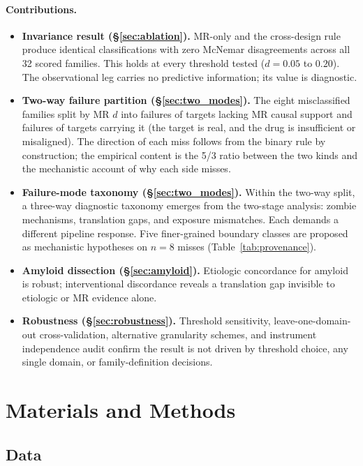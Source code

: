 \documentclass[11pt]{article}
\begin{document}
\paragraph{Contributions.}
\begin{itemize}
\item \textbf{Invariance result (\S\ref{sec:ablation}).} MR-only and the cross-design rule produce identical classifications with zero McNemar disagreements across all 32 scored families. This holds at every threshold tested ($d = 0.05$ to $0.20$). The observational leg carries no predictive information; its value is diagnostic.
\item \textbf{Two-way failure partition (\S\ref{sec:two_modes}).} The eight misclassified families split by MR $d$ into failures of targets lacking MR causal support and failures of targets carrying it (the target is real, and the drug is insufficient or misaligned). The direction of each miss follows from the binary rule by construction; the empirical content is the 5/3 ratio between the two kinds and the mechanistic account of why each side misses.
\item \textbf{Failure-mode taxonomy (\S\ref{sec:two_modes}).} Within the two-way split, a three-way diagnostic taxonomy emerges from the two-stage analysis: zombie mechanisms, translation gaps, and exposure mismatches. Each demands a different pipeline response. Five finer-grained boundary classes are proposed as mechanistic hypotheses on $n = 8$ misses (Table~\ref{tab:provenance}).
\item \textbf{Amyloid dissection (\S\ref{sec:amyloid}).} Etiologic concordance for amyloid is robust; interventional discordance reveals a translation gap invisible to etiologic or MR evidence alone.
\item \textbf{Robustness (\S\ref{sec:robustness}).} Threshold sensitivity, leave-one-domain-out cross-validation, alternative granularity schemes, and instrument independence audit confirm the result is not driven by threshold choice, any single domain, or family-definition decisions.
\end{itemize}

\section{Materials and Methods}

\subsection{Data}
\end{document}
